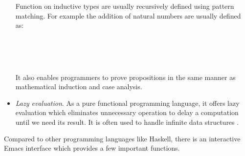 \begin{itemize}
Function on inductive types are usually recursively defined using pattern matching. For example the addition of natural numbers are usually defined as:

\begin{code}\>\<%
\\
\>\AgdaFunction{\_+\_} \AgdaSymbol{:}     \<%
\\
\> \<[6]%
\>[6]\AgdaFunction{+}  \AgdaSymbol{=} \<%
\\
\>  \AgdaFunction{+}  \AgdaSymbol{=}  \AgdaSymbol{(} \AgdaFunction{+} \AgdaSymbol{)}\<%
\>\<\end{code}

It also enables programmers to prove propositions in the same manner as mathematical induction and case analysis.

\item \textit{Lazy evaluation}. As a pure functional programming language, it offers lazy evaluation which eliminates unnecessary operation to delay a computation until we need its result. It is often used to handle infinite data structures \cite{wiki:Lazy_evaluation}.

\end{itemize}

Compared to other programming languages like Haskell, there is an interactive Emacs interface which provides a few important functions.

